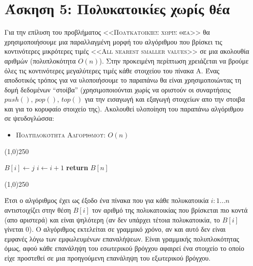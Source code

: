 \documentclass[a4paper,12pt]{report}
\begin{document}
\section*{Άσκηση 5: Πολυκατοικίες χωρίς θέα} 
Για την επίλυση του προβλήματος \textsc{<<Πολυκατοικίες χωρίς θέα>>} θα χρησιμοποιήσουμε μια παραλλαγμένη μορφή του αλγόριθμου που βρίσκει τις κοντινότερες μικρότερες τιμές \textsc{<<All nearest smaller values>>} σε μια ακολουθία αριθμών (πολυπλοκότητα $O(n)$). Στην προκειμένη περίπτωση χρειάζεται να βρούμε όλες τις κοντινότερες μεγαλύτερες τιμές κάθε στοιχείου του πίνακα Α. Ένας αποδοτικός τρόπος για να υλοποιήσουμε το παραπάνω θα είναι χρησιμοποιώντας τη δομή δεδομένων ``στοίβα'' (χρησιμοποιούνται χωρίς να οριστούν οι συναρτήσεις $push()$, $pop()$, $top()$ για την εισαγωγή και εξαγωγή στοιχείων απο την στοιβα και για το κορυφαίο στοιχείο της). Ακολουθεί υλοποίηση του παραπάνω αλγόριθμου σε ψευδογλώσσα:
\begin{itemize}
  \item \textsc{Πολυπλοκότητα Αλγορίθμου}: $O(n)$ 
\end{itemize}
\begin{center}
\line(1,0){250} 
\begin{algorithmic}[1]
   
    \EndWhile
    \Else
      \State $B[i] \gets j$
      \State $i \gets i+1$
    \EndIf
  \EndFor
  \State \textbf{return} $B[n]$ 
\EndProcedure
\end{algorithmic}
\line(1,0){250} 
\end{center} 

Έτσι ο αλγόριθμος έχει ως έξοδο ένα πίνακα που για κάθε πολυκατοικία $i:1...n$ αντιστοιχίζει στην θέση $B[i]$ τον αριθμό της πολυκατοικίας που βρίσκεται πιο κοντά (απο αριστερά) και είναι ψηλότερη (αν δεν υπάρχει τέτοια πολυκατοικία, το $B[i]$ γίνεται 0). Ο αλγόριθμος εκτελείται σε γραμμικό χρόνο, αν και αυτό δεν είναι εμφανές λόγω των εμφωλευμένων επαναλήψεων. Είναι γραμμικής πολυπλοκότητας όμως, αφού κάθε επανάληψη του εσωτερικού βρόγχου αφαιρεί ένα στοιχείο το οποίο είχε προστεθεί σε μια προηγούμενη επανάληψη του εξωτερικού βρόγχου.
\end{document}
